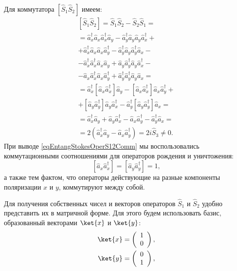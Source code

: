 Для коммутатора $\left[\hat{S}_1\hat{S}_2\right]$ имеем:
\begin{eqnarray}
\left[\hat{S}_1\hat{S}_2\right] = \hat{S}_1\hat{S}_2 -
\hat{S}_2\hat{S}_1 = 
\nonumber \\
=
\hat{a}_x^{\dag}\hat{a}_x\hat{a}_x^{\dag}\hat{a}_y -
\hat{a}_y^{\dag}\hat{a}_y\hat{a}_y\hat{a}_x^{\dag} + 
\nonumber \\
+ \hat{a}_x^{\dag}\hat{a}_x\hat{a}_x\hat{a}_y^{\dag} -
\hat{a}_y^{\dag}\hat{a}_y\hat{a}_y^{\dag}\hat{a}_x -
\nonumber \\
- \hat{a}_x^{\dag}\hat{a}_x^{\dag}\hat{a}_x\hat{a}_y +
\hat{a}_y\hat{a}_y^{\dag}\hat{a}_y\hat{a}_x^{\dag} -
\nonumber \\
- \hat{a}_x\hat{a}_x^{\dag}\hat{a}_x\hat{a}_y^{\dag} +
\hat{a}_y^{\dag}\hat{a}_y^{\dag}\hat{a}_y\hat{a}_x =
\nonumber \\
= \hat{a}_x^{\dag}\left[\hat{a}_x\hat{a}_x^{\dag}\right]\hat{a}_y -
\left[\hat{a}_x\hat{a}_x^{\dag}\right]\hat{a}_x\hat{a}_y^{\dag} +
\nonumber \\
+\left[\hat{a}_y\hat{a}_y^{\dag}\right]\hat{a}_y\hat{a}_x^{\dag} -
\hat{a}_y^{\dag}\left[\hat{a}_y\hat{a}_y^{\dag}\right]\hat{a}_x =
\nonumber \\
= \hat{a}_x^{\dag}\hat{a}_y + \hat{a}_y\hat{a}_x^{\dag} -
\hat{a}_x\hat{a}_y^{\dag} - \hat{a}_y^{\dag}\hat{a}_x = 
\nonumber \\
= 2 \left(\hat{a}_x^{\dag}\hat{a}_y - \hat{a}_x\hat{a}_y^{\dag}\right) = 2 i
\hat{S}_3 \ne 0.
\label{eqEntangStokesOperS12Comm}
\end{eqnarray}
При выводе \eqref{eqEntangStokesOperS12Comm} мы воспользовались
коммутационными соотношениями для операторов рождения и уничтожения:
\begin{equation}
\left[\hat{a}_x \hat{a}^{\dag}_x\right] = \left[\hat{a}_y \hat{a}^{\dag}_y\right] = 1,
\nonumber
\end{equation}
а также тем фактом, что операторы действующие на разные компоненты
поляризации $x$ и $y$, коммутируют между собой.

Для получения собственных чисел и векторов операторов $\hat{S}_1$ и
$\hat{S}_2$ удобно представить их в матричной форме. Для этого будем
использовать базис, образованный векторами $\ket{x}$ и
$\ket{y}$:
\begin{eqnarray}
\ket{x} = \left(
\begin{array}{c}
1 \\
0
\end{array}
\right),
\nonumber \\
\ket{y} = \left(
\begin{array}{c}
0 \\
1
\end{array}
\right),
\nonumber
\end{eqnarray}

